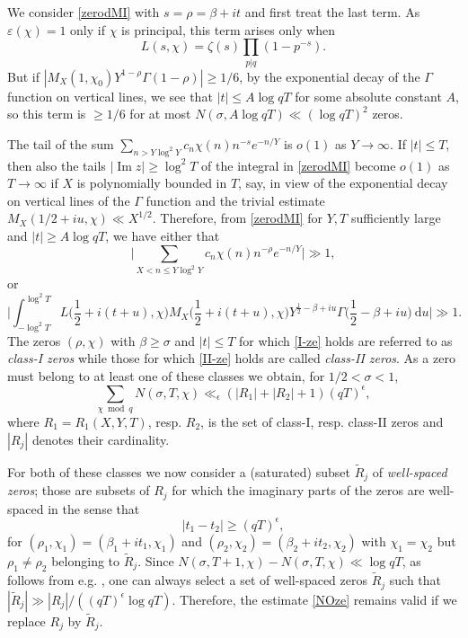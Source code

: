 \documentclass[12pt]{amsart}
\theoremstyle{definition}
\theoremstyle{plain}
\theoremstyle{remark}
\numberwithin{equation}{section}
\numberwithin{theorem}{section}
\renewcommand{\Im}{\operatorname{Im}}
\numberwithin{equation}{section}
\begin{document}
	We consider \eqref{zerodMI} with $s=\rho= \beta + it$ and first treat the last term. As $\varepsilon(\chi)=1$ only if $\chi$ is principal, this term arises only when 
	\[L(s, \chi)= \zeta(s)\prod_{p | q}(1-p^{-s}).\]
	But if $|M_{X}(1, \chi_{0})Y^{1-\rho}\Gamma(1-\rho)| \geq 1/6$, by the exponential decay of the $\Gamma$ function on vertical lines, we see that $|t| \leq A \log qT$ for some absolute constant $A$, so this term is $\geq 1/6$ for at most $N(\sigma, A\log qT) \ll (\log qT)^{2}$ zeros.
	
	The tail of the sum $\sum_{n > Y\log^2 Y} c_n \chi(n)n^{-s} e^{-n/Y}$ is $o(1)$ as $Y\to \infty$. If $|t| \leq T$, then also the tails $|\Im z| \geq \log^{2} T$ of the integral in \eqref{zerodMI} become $o(1)$ as $T \to \infty$ if $X$ is polynomially bounded in $T$, say, in view of the exponential decay on vertical lines of the $\Gamma$ function and the trivial estimate $M_X(1/2 + iu, \chi) \ll X^{1/2}$. Therefore,  from \eqref{zerodMI} for $Y, T$ sufficiently large and $|t|\geq A\log qT$, we have either that
	\begin{equation} \label{I-ze}
		\bigg| \sum_{X< n \leq Y\log^{2}Y}c_n\chi(n) n^{-\rho}e^{-n/Y}\bigg| \gg 1, 
	\end{equation}
	or
	\begin{equation} \label{II-ze}
		\bigg| \int_{-\log ^{2} T}^{\log ^{2} T} L\bigg(\frac{1}{2}+i(t +u), \chi\bigg) M_{X}\bigg(\frac{1}{2}+i (t+u),\chi \bigg) Y^{\frac{1}{2}-\beta+iu}\Gamma\bigg(\frac{1}{2}-\beta+iu\bigg)\:\mathrm{d}u \bigg| \gg 1.
	\end{equation}
	The zeros $(\rho, \chi)$ with $\beta \geq \sigma$ and $|t| \leq T$ for which \eqref{I-ze} holds are referred to as \emph{class-I zeros} while those for which \eqref{II-ze} holds are called \emph{class-II zeros}. As a zero must belong to at least one of these classes we obtain, for $1/2 < \sigma < 1$,
	\begin{equation} \label{NOze}
		\sum_{\chi \bmod q} N(\sigma, T, \chi) \ll_{\epsilon} (|R_1|+|R_2|+1)(qT)^{\epsilon},
	\end{equation}	
	where $R_{1} = R_1(X,Y,T)$, resp. $R_2$, is the set of class-I, resp. class-II zeros and $|R_{j}|$ denotes their cardinality.
	
	For both of these classes we now consider a (saturated) subset $\tilde{R}_{j}$ of \emph{well-spaced zeros}; those are subsets of $R_j$ for which the imaginary parts of the zeros are well-spaced in the sense that 
	\begin{equation*} \label{disze}
		|t_{1} - t_{2}| \geq (qT)^{\epsilon}, 
	\end{equation*}
	for $(\rho_1, \chi_{1}) = (\beta_1 + it_1, \chi_{1})$ and $(\rho_2, \chi_{2}) = (\beta_2 + it_2, \chi_{2})$ with $\chi_{1}=\chi_{2}$ but $\rho_{1} \neq \rho_2$ belonging to $\tilde{R}_j$. Since  $N(\sigma, T+ 1, \chi) - N(\sigma, T, \chi) \ll \log qT$, as follows from e.g. \cite[Chapter 16]{DavenportBook}, one can always select a set of well-spaced zeros $\tilde{R}_j$ such that $|\tilde{R}_j| \gg |R_j| / ((qT)^\epsilon \log qT)$. Therefore, the estimate \eqref{NOze} remains valid if we replace $R_j$ by $\tilde{R}_j$.  
	
\end{document}
